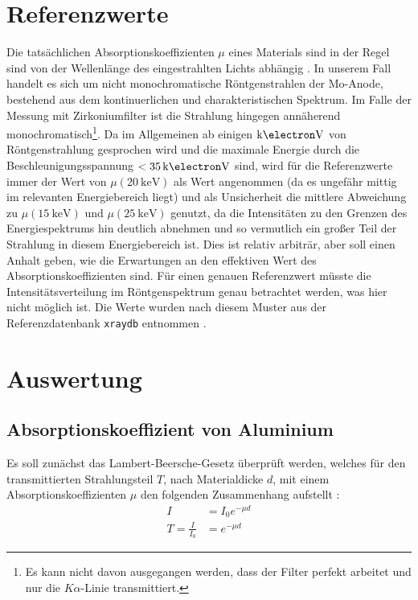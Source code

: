 \section{Referenzwerte}
\label{sec:ref_mu}

Die tatsächlichen Absorptionskoeffizienten $\mu$ eines Materials sind in der Regel sind von der Wellenlänge des eingestrahlten Lichts abhängig \cite[7]{LDctmodul}. In unserem Fall handelt es sich um nicht monochromatische Röntgenstrahlen der Mo-Anode, bestehend aus dem kontinuerlichen und charakteristischen Spektrum. Im Falle der Messung mit Zirkoniumfilter ist die Strahlung hingegen annäherend monochromatisch\footnote{Es kann nicht davon ausgegangen werden, dass der Filter perfekt arbeitet und nur die $K\alpha$-Linie transmittiert.}. Da im Allgemeinen ab einigen $\unit{\kilo\electron\volt}$ von Röntgenstrahlung gesprochen wird und die maximale Energie durch die Beschleunigungsspannung $< \SI{35}{\kilo\electron\volt}$ sind, wird für die Referenzwerte immer der Wert von $\mu(\SI{20}{\kilo\eV})$ als Wert angenommen (da es ungefähr mittig im relevanten Energiebereich liegt) und als Unsicherheit die mittlere Abweichung zu $\mu(\SI{15}{\kilo\eV})$ und $\mu(\SI{25}{\kilo\eV})$ genutzt, da die Intensitäten zu den Grenzen des Energiespektrums hin deutlich abnehmen und so vermutlich ein großer Teil der Strahlung in diesem Energiebereich ist. Dies ist relativ arbiträr, aber soll einen Anhalt geben, wie die Erwartungen an den effektiven Wert des Absorptionskoeffizienten sind. Für einen genauen Referenzwert müsste die Intensitätsverteilung im Röntgenspektrum genau betrachtet werden, was hier nicht möglich ist. Die Werte wurden nach diesem Muster aus der Referenzdatenbank \texttt{xraydb} entnommen \cite{xraydb}.


\section{Auswertung}
\subsection{Absorptionskoeffizient von Aluminium}
Es soll zunächst das Lambert-Beersche-Gesetz überprüft werden, welches für den transmittierten Strahlungsteil $T$, nach Materialdicke $d$, mit einem Absorptionskoeffizienten $\mu$ den folgenden Zusammenhang aufstellt \cite[574]{gerthsen}:
\begin{align}
	I &= I_0 e^{-\mu d} \\
	T = \frac{I}{I_0} &= e^{-\mu d} \label{eq:lambert}
\end{align}


